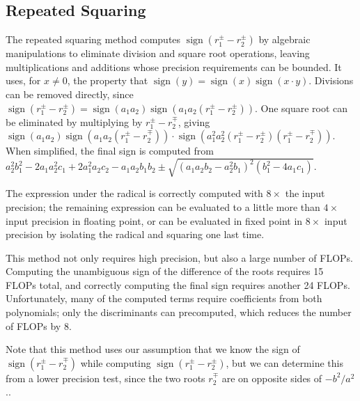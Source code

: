 \documentclass{cccg16}
\DeclareMathOperator{\sign}{sign}
\begin{document}
\subsection{Repeated Squaring}
The repeated squaring method computes $\sign(r_1^\pm-r_2^\pm)$ by algebraic
manipulations to eliminate division and square root
operations, leaving multiplications and additions whose precision requirements can be bounded. 
It uses, for $x\ne 0$,  the property that $\sign(y)=\sign(x)\sign(x\cdot y)$.   
Divisions can be removed directly, since 
 $\sign(r_1^\pm-r_2^\pm)=\sign(a_1 a_2)\sign(a_1 a_2 (r_1^\pm-r_2^\pm))$.  One 
square root can be eliminated by multiplying by $r_1^\pm-r_2^\mp$,
giving~$\sign(a_1 a_2)\sign(a_1 a_2
(r_1^\pm-r_2^\mp))\cdot\sign(a_1^2 a_2^2 (r_1^\pm - r_2^\pm) (r_1^\pm -
r_2^\mp))$.  When simplified, the final sign is computed
from~$a_2^2b_1^2-2a_1a_2^2c_1+2a_1^2a_2c_2-a_1a_2b_1b_2\pm
\sqrt{(a_1a_2b_2-a_2^2b_1)^2(b_1^2-4a_1c_1)}$.   

The expression under the radical is correctly computed with $8\times$ the input precision; the remaining expression can be evaluated to a little more than $4\times$ input precision in floating point, or can be evaluated in fixed point in $8\times$ input precision by isolating the radical and squaring one last time. 

This method not only requires high precision, but also a large number of FLOPs.  Computing the
unambiguous sign of the difference of the roots requires 15 FLOPs
total, and  correctly computing the final sign requires another 24 FLOPs.
Unfortunately,  many of the computed terms require coefficients
from both polynomials; only the discriminants can precomputed, which reduces the number of FLOPs by 8.

Note that this method uses our assumption that we know the sign of $\sign(r_1^\pm-r_2^\mp)$ while computing
$\sign(r_1^\pm-r_2^\pm)$, but we can determine this from a lower precision test, since the two roots $r_2^\mp$ are on opposite sides of $-b^2/a^2$..
\end{document}
